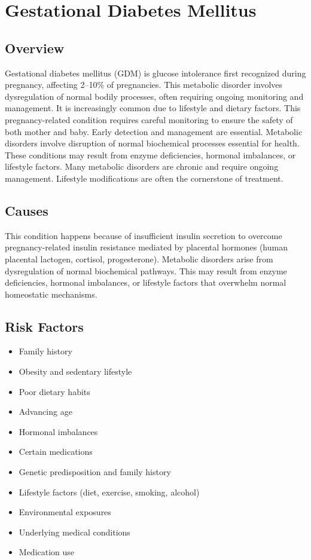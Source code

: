 \chapter{Gestational Diabetes Mellitus}
\label{sec:Gestational Diabetes Mellitus}

\section{Overview}
Gestational diabetes mellitus (GDM) is glucose intolerance first recognized during pregnancy, affecting 2--10\% of pregnancies. This metabolic disorder involves dysregulation of normal bodily processes, often requiring ongoing monitoring and management. It is increasingly common due to lifestyle and dietary factors. This pregnancy-related condition requires careful monitoring to ensure the safety of both mother and baby. Early detection and management are essential. Metabolic disorders involve disruption of normal biochemical processes essential for health. These conditions may result from enzyme deficiencies, hormonal imbalances, or lifestyle factors. Many metabolic disorders are chronic and require ongoing management. Lifestyle modifications are often the cornerstone of treatment.
\section{Causes}
This condition happens because of insufficient insulin secretion to overcome pregnancy-related insulin resistance mediated by placental hormones (human placental lactogen, cortisol, progesterone). Metabolic disorders arise from dysregulation of normal biochemical pathways. This may result from enzyme deficiencies, hormonal imbalances, or lifestyle factors that overwhelm normal homeostatic mechanisms.   
\section{Risk Factors}

\begin{itemize}[noitemsep]
  \item Family history
  \item Obesity and sedentary lifestyle
  \item Poor dietary habits
  \item Advancing age
  \item Hormonal imbalances
  \item Certain medications
  \item Genetic predisposition and family history
  \item Lifestyle factors (diet, exercise, smoking, alcohol)
  \item Environmental exposures
  \item Underlying medical conditions
  \item Medication use
\end{itemize}
